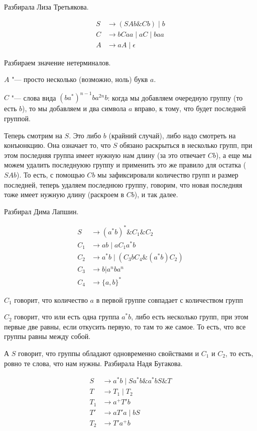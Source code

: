 Разбирала Лиза Третьякова.

\begin{align*}
S &\to (SAb \& Cb) \mid b \\
C &\to bCaa \mid aC \mid baa \\
A &\to aA \mid \epsilon
\end{align*}

Разбираем значение нетерминалов.

$A$ "--- просто несколько (возможно, ноль) букв $a$.

$C$ "--- слова вида $(ba^*)^{n - 1} b a^{2n} b$: когда мы добавляем очередную группу (то есть $b$), то мы добавляем и два символа $a$ вправо, к тому, что будет последней группой.

Теперь смотрим на $S$. Это либо $b$ (крайний случай), либо надо смотреть на конъюнкцию.
Она означает то, что $S$ обязано раскрыться в несколько групп, при этом последняя группа имеет нужную нам длину (за это отвечает $Cb$), 
а еще мы можем удалить последнуюю группу и применить это же правило для остатка ($SAb$). 
То есть, с помощью $Cb$ мы зафиксировали количество групп и размер последней, теперь удаляем последнюю группу, говорим, что новая последняя тоже имеет нужную длину (раскроем в $Cb$), и так далее.

Разбирал Дима Лапшин.

\begin{align*}
S &\to (a^*b)^* \& C_1 \& C_2 \\
C_1 &\to ab \mid aC_1 a^* b \\
C_2 &\to a^*b \mid (C_3b C_4 \& (a^*b)C_2)\\
C_3 &\to b | a^n b a^n \\
C_4 &\to \{a, b\}^*
\end{align*}

$C_1$ говорит, что количество $a$ в первой группе совпадает с количеством групп

$C_2$ говорит, что или есть одна группа $a^*b$, либо есть несколько групп, при этом первые две равны, если откусить первую, то там то же самое. То есть, что все группы равны между собой.

А $S$ говорит, что группы обладают одновременно свойствами и $C_1$ и $C_2$, то есть, ровно те слова, что нам нужны.
Разбирала Надя Бугакова.

\begin{align*}
S &\to a^*b \mid Sa^*b \& a^*bS \& T \\ 
T &\to T_1 \mid T_2 \\
T_1 &\to a^+T'b \\
T' &\to aT'a \mid bS \\
T_2 &\to T'a^+b
\end{align*}

